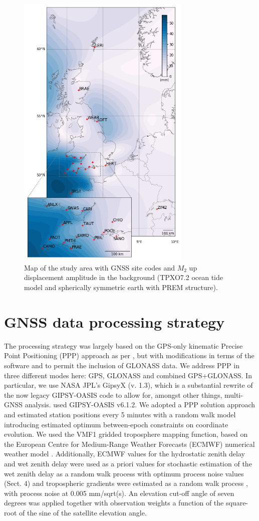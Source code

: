 \documentclass[se, manuscript]{copernicus}
\begin{document}
\begin{figure}[t]
\includegraphics[width=8.3cm]{fig01_updated.png}
\caption{Map of the study area with GNSS site codes and $M_2$ up displacement amplitude in the background (TPXO7.2 ocean tide model and spherically symmetric earth with PREM structure).}
\end{figure}

\section{GNSS data processing strategy}

The processing strategy was largely based on the GPS-only kinematic Precise Point Positioning (PPP) approach \citep{Zumberge1997} %
as per \cite{Penna2015}, but with modifications in terms of the software and to permit the inclusion of GLONASS data. We address PPP in three different modes here: GPS, GLONASS and combined GPS+GLONASS. In particular, we use NASA JPL’s GipsyX (v. 1.3), which is a substantial rewrite of the now legacy GIPSY-OASIS code to allow for, amongst other things, multi-GNSS analysis. \cite{Penna2015} used GIPSY-OASIS v6.1.2.
We adopted a PPP solution approach and estimated station positions every 5 minutes with a random walk model introducing estimated optimum between-epoch constraints on coordinate evolution. We used the VMF1 gridded troposphere mapping function, based on the European Centre for Medium-Range Weather Forecasts (ECMWF) numerical weather model \citep{Boehm2006}. Additionally, ECMWF values for the hydrostatic zenith delay and wet zenith delay were used as a priori values for stochastic estimation of the wet zenith delay as a random walk process with optimum process noise values (Sect. 4) and tropospheric gradients were estimated as a random walk process \citep{Bar-Sever1998}, with process noise at 0.005 mm/sqrt(s). An elevation cut-off angle of seven degrees was applied together with observation weights a function of the square-root of the sine of the satellite elevation angle.
\end{document}

